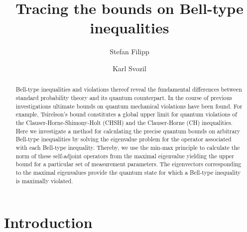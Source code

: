 \documentclass[pra,amsmath,amsfonts,showkeys,showpacs,preprint]{revtex4}
\begin{document}
\title{Tracing the bounds on Bell-type inequalities}
\author{Stefan Filipp}
\author{Karl Svozil}

\begin{abstract}
Bell-type inequalities and violations thereof reveal the fundamental
differences between standard probability theory and its
quantum counterpart. In the course of previous investigations
ultimate bounds on quantum mechanical violations have been
found. For example, Tsirelson's bound constitutes a global upper limit
for quantum violations of the Clauser-Horne-Shimony-Holt (CHSH) and
the Clauser-Horne (CH) inequalities.
Here we investigate a method for calculating the precise quantum bounds on arbitrary
Bell-type
inequalities by solving the eigenvalue problem for the operator
associated with each Bell-type inequality. Thereby, we use the min-max
principle to calculate the norm of these self-adjoint operators from
the maximal eigenvalue yielding the upper bound for a particular set
of measurement parameters. The eigenvectors corresponding to
the maximal eigenvalues provide the quantum state for which a
Bell-type inequality is maximally violated.
\end{abstract}

\maketitle

\section{Introduction}
\end{document}
